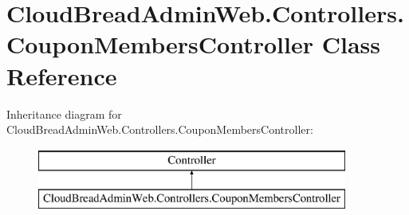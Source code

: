 \hypertarget{a00070}{}\section{Cloud\+Bread\+Admin\+Web.\+Controllers.\+Coupon\+Members\+Controller Class Reference}
\label{a00070}
Inheritance diagram for Cloud\+Bread\+Admin\+Web.\+Controllers.\+Coupon\+Members\+Controller\+:\begin{figure}[H]
\begin{center}
\leavevmode
\includegraphics[height=2.000000cm]{a00070}
\end{center}
\end{figure}
